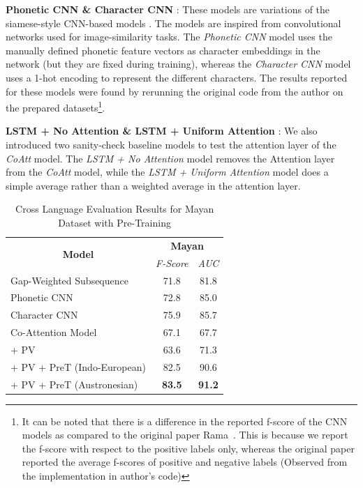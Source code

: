\documentclass[11pt,letterpaper]{article}
\begin{document}
\textbf{Phonetic CNN \& Character CNN} : These models are variations of the siamese-style CNN-based models \cite{rama2016siamese}. The models are inspired from convolutional networks used for image-similarity tasks. The \textit{Phonetic CNN} model uses the manually defined phonetic feature vectors as character embeddings in the network (but they are fixed during training), whereas the \textit{Character CNN} model uses a 1-hot encoding to represent the different characters. The results reported for these models were found by rerunning the original code from the  author on the prepared datasets\footnote{It can be noted that there is a difference in the reported f-score of the CNN models as compared to the original paper Rama~. This is because we report the f-score with respect to the positive labels only, whereas the original paper reported the average f-scores of positive and negative labels (Observed from the implementation in author's code)}.

\textbf{LSTM + No Attention \& LSTM + Uniform Attention} : We also introduced two sanity-check baseline models to test the attention layer of the \textit{CoAtt} model. The \textit{LSTM + No Attention} model removes the Attention layer from the \textit{CoAtt} model, while the \textit{LSTM + Uniform Attention} model does a simple average rather than a weighted average in the attention layer.

\begin{table}[htpb]
\centering
\begin{tabular}{lcc}
\multicolumn{1}{c}{\multirow{2}{*}{\textbf{Model}}} & \multicolumn{2}{c}{\textbf{Mayan}} \\ \cline{2-3} 
\multicolumn{1}{c}{}                                & \textit{F-Score}  & \textit{AUC}   \\ \hline
Gap-Weighted Subsequence                            & 71.8              & 81.8           \\
Phonetic CNN                                        & 72.8              & 85.0           \\
Character CNN                                       & 75.9              & 85.7           \\ \hline
Co-Attention Model                                  & 67.1              & 67.7           \\
\quad + PV                                          & 63.6              & 71.3           \\
\quad + PV + PreT (Indo-European)                   & 82.5              & 90.6           \\
\quad + PV + PreT (Austronesian)                    & \textbf{83.5}     & \textbf{91.2} 
\end{tabular}
\caption{Cross Language Evaluation Results for Mayan Dataset with Pre-Training }
\label{CL_res_2}
\end{table}
\end{document}
